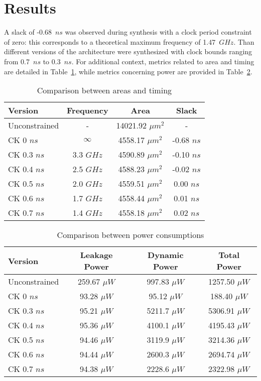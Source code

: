 \section{Results}
A slack of -0.68~$ns$ was observed during synthesis with a clock period constraint of zero: this corresponds to a theoretical maximum frequency of 1.47~$GHz$. Than different versions of the architecture were synthesized with clock bounds ranging from 0.7~$ns$ to 0.3~$ns$. For additional context, metrics related to area and timing are detailed in Table~\ref{tab:areatiming_report}, while metrics concerning power are provided in Table~\ref{tab:power_report}. \\

\begin{table}[!htbp]
	\small
	\centering
	\begin{tabular}{lccc}
		\toprule
		\textbf{Version} & \textbf{Frequency} & \textbf{Area} & \textbf{Slack} \\
		\midrule
		Unconstrained & - & 14021.92 $\mu m^{2}$ & - \\
		CK 0 $ns$ & $\infty$ & 4558.17 $\mu m^{2}$ & -0.68 $ns$ \\
		CK 0.3 $ns$ & 3.3 $GHz$ & 4590.89 $\mu m^{2}$ & -0.10 $ns$ \\
		CK 0.4 $ns$ & 2.5 $GHz$ & 4588.23 $\mu m^{2}$ & -0.02 $ns$ \\
		CK 0.5 $ns$ & 2.0 $GHz$ & 4559.51 $\mu m^{2}$ & 0.00 $ns$ \\
		CK 0.6 $ns$ & 1.7 $GHz$ & 4558.44 $\mu m^{2}$ & 0.01 $ns$ \\
		CK 0.7 $ns$ & 1.4 $GHz$ & 4558.18 $\mu m^{2}$ & 0.02 $ns$ \\
		\bottomrule
	\end{tabular}
	\caption{Comparison between areas and timing}
	\label{tab:areatiming_report}
\end{table}

\begin{table}[!htbp]
	\small
	\centering
	\begin{tabular}{lccc}
		\toprule
		\textbf{Version} & \textbf{Leakage Power} & \textbf{Dynamic Power} & \textbf{Total Power} \\
		\midrule
		Unconstrained & 259.67 $\mu W$ & 997.83 $\mu W$ & 1257.50 $\mu W$ \\
		CK 0 $ns$ & 93.28 $\mu W$ & 95.12 $\mu W$ & 188.40  $\mu W$ \\
		CK 0.3 $ns$ & 95.21 $\mu W$ & 5211.7 $\mu W$ & 5306.91 $\mu W$ \\
		CK 0.4 $ns$ & 95.36 $\mu W$ & 4100.1 $\mu W$ & 4195.43 $\mu W$ \\
		CK 0.5 $ns$ & 94.46 $\mu W$ & 3119.9 $\mu W$ & 3214.36 $\mu W$ \\
		CK 0.6 $ns$ & 94.44 $\mu W$ & 2600.3 $\mu W$ & 2694.74 $\mu W$ \\
		CK 0.7 $ns$ & 94.38 $\mu W$ & 2228.6 $\mu W$ & 2322.98 $\mu W$ \\
		\bottomrule
	\end{tabular}
	\caption{Comparison between power consumptions}
	\label{tab:power_report}
\end{table}

